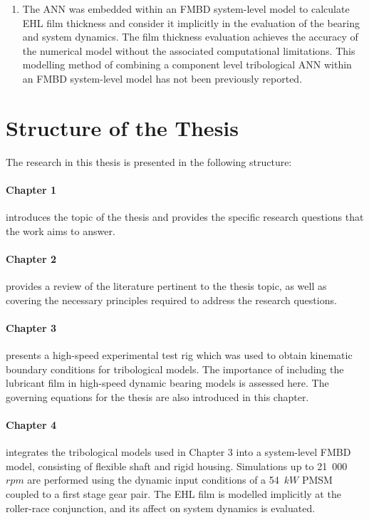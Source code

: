 \begin{enumerate}
	\item The ANN was embedded within an FMBD system-level model to calculate EHL film thickness and consider it implicitly in the evaluation of the bearing and system dynamics. The film thickness evaluation achieves the accuracy of the numerical model without the associated computational limitations. This modelling method of combining a component level tribological ANN within an FMBD system-level model has not been previously reported.
\end{enumerate}

\section{Structure of the Thesis} \label{Structure of Thesis}

The research in this thesis is presented in the following structure:

\paragraph{Chapter 1} introduces the topic of the thesis and provides the specific research questions that the work aims to answer.

\paragraph{Chapter 2} provides a review of the literature pertinent to the thesis topic, as well as covering the necessary principles required to address the research questions.

\paragraph{Chapter 3} presents a high-speed experimental test rig which was used to obtain kinematic boundary conditions for tribological models. The importance of including the lubricant film in high-speed dynamic bearing models is assessed here. The governing equations for the thesis are also introduced in this chapter.

\paragraph{Chapter 4} integrates the tribological models used in Chapter 3 into a system-level FMBD model, consisting of flexible shaft and rigid housing. Simulations up to 21~000~$rpm$ are performed using the dynamic input conditions of a 54~$kW$ PMSM coupled to a first stage gear pair. The EHL film is modelled implicitly at the roller-race conjunction, and its affect on system dynamics is evaluated.

